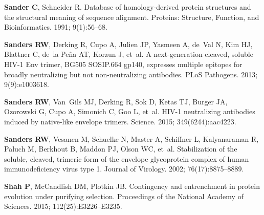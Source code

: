 \documentclass[9pt]{elife}
\begin{document}
\begin{thebibliography}{114}
\textbf{\color{eLifeMediumGrey} Sander C}, Schneider R.
\newblock Database of homology-derived protein structures and the structural
  meaning of sequence alignment.
\newblock Proteins: Structure, Function, and Bioinformatics.  1991;
  9(1):56--68.

\textbf{\color{eLifeMediumGrey} Sanders RW}, Derking R, Cupo A, Julien JP,
  Yasmeen A, de~Val N, Kim HJ, Blattner C, de~la Pe{\~n}a AT, Korzun J, et~al.
\newblock A next-generation cleaved, soluble {HIV-1} Env trimer, {BG505
  SOSIP.664 gp140}, expresses multiple epitopes for broadly neutralizing but
  not non-neutralizing antibodies.
\newblock PLoS Pathogens.  2013; 9(9):e1003618.

\textbf{\color{eLifeMediumGrey} Sanders RW}, Van~Gils MJ, Derking R, Sok D,
  Ketas TJ, Burger JA, Ozorowski G, Cupo A, Simonich C, Goo L, et~al.
\newblock HIV-1 neutralizing antibodies induced by native-like envelope
  trimers.
\newblock Science.  2015; 349(6244):aac4223.

\textbf{\color{eLifeMediumGrey} Sanders RW}, Vesanen M, Schuelke N, Master A,
  Schiffner L, Kalyanaraman R, Paluch M, Berkhout B, Maddon PJ, Olson WC,
  et~al.
\newblock Stabilization of the soluble, cleaved, trimeric form of the envelope
  glycoprotein complex of human immunodeficiency virus type 1.
\newblock Journal of Virology.  2002; 76(17):8875--8889.

\textbf{\color{eLifeMediumGrey} Shah P}, McCandlish DM, Plotkin JB.
\newblock Contingency and entrenchment in protein evolution under purifying
  selection.
\newblock Proceedings of the National Academy of Sciences.  2015;
  112(25):E3226--E3235.


\end{thebibliography}
\end{document}
